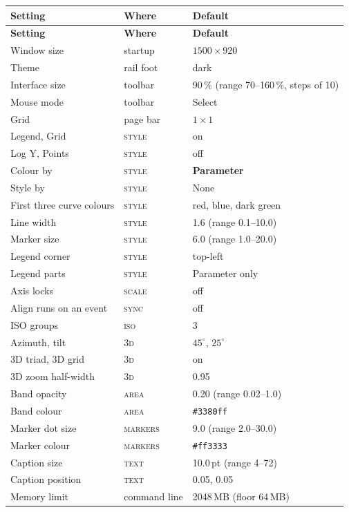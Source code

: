 \documentclass[11pt,a4paper,oneside]{report}
\newcommand{\code}[1]{\texttt{#1}}
\newcommand{\tab}[1]{\textsc{#1}}
\begin{document}
\begin{center}
\small
\begin{longtable}{@{}p{}p{}p{}@{}}
\toprule
\textbf{Setting} & \textbf{Where} & \textbf{Default} \\
\midrule
\endfirsthead
\toprule
\textbf{Setting} & \textbf{Where} & \textbf{Default} \\
\midrule
\endhead
Window size & startup & $1500 \times 920$ \\
Theme & rail foot & dark \\
Interface size & toolbar & 90\,\% (range 70--160\,\%, steps of 10) \\
Mouse mode & toolbar & Select \\
Grid & page bar & $1 \times 1$ \\
Legend, Grid & \tab{style} & on \\
Log Y, Points & \tab{style} & off \\
Colour by & \tab{style} & \textbf{Parameter} \\
Style by & \tab{style} & None \\
First three curve colours & \tab{style} & red, blue, dark green \\
Line width & \tab{style} & 1.6 (range 0.1--10.0) \\
Marker size & \tab{style} & 6.0 (range 1.0--20.0) \\
Legend corner & \tab{style} & top-left \\
Legend parts & \tab{style} & Parameter only \\
Axis locks & \tab{scale} & off \\
Align runs on an event & \tab{sync} & off \\
ISO groups & \tab{iso} & 3 \\
Azimuth, tilt & \tab{3d} & $45^\circ$, $25^\circ$ \\
3D triad, 3D grid & \tab{3d} & on \\
3D zoom half-width & \tab{3d} & 0.95 \\
Band opacity & \tab{area} & 0.20 (range 0.02--1.0) \\
Band colour & \tab{area} & \code{\#3380ff} \\
Marker dot size & \tab{markers} & 9.0 (range 2.0--30.0) \\
Marker colour & \tab{markers} & \code{\#ff3333} \\
Caption size & \tab{text} & 10.0\,pt (range 4--72) \\
Caption position & \tab{text} & 0.05, 0.05 \\
Memory limit & command line & 2048\,MB (floor 64\,MB) \\
\bottomrule
\end{longtable}
\end{center}
\end{document}
